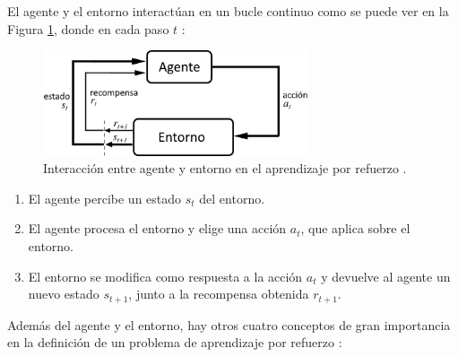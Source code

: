 El agente y el entorno interactúan en un bucle continuo como se puede ver en la Figura \ref{fig:chap3-rl}, donde en cada paso $t$ \cite{Sutton1998}:

\begin{figure}[h]
    \centering
    \includegraphics[width=0.7\textwidth]{imagenes/cap3/rl.png}
    \caption{Interacción entre agente y entorno en el aprendizaje por refuerzo \cite{Sutton1998}.}
    \label{fig:chap3-rl}
\end{figure}

\begin{enumerate}
\item El agente percibe un estado $s_t$ del entorno.
\item El agente procesa el entorno y elige una acción $a_t$, que aplica sobre el entorno.
\item El entorno se modifica como respuesta a la acción $a_t$ y devuelve al agente un nuevo estado $s_{t+1}$, junto a la recompensa obtenida $r_{t+1}$.
\end{enumerate}

Además del agente y el entorno, hay otros cuatro conceptos de gran importancia en la definición de un problema de aprendizaje por refuerzo \cite{Sutton1998}:

